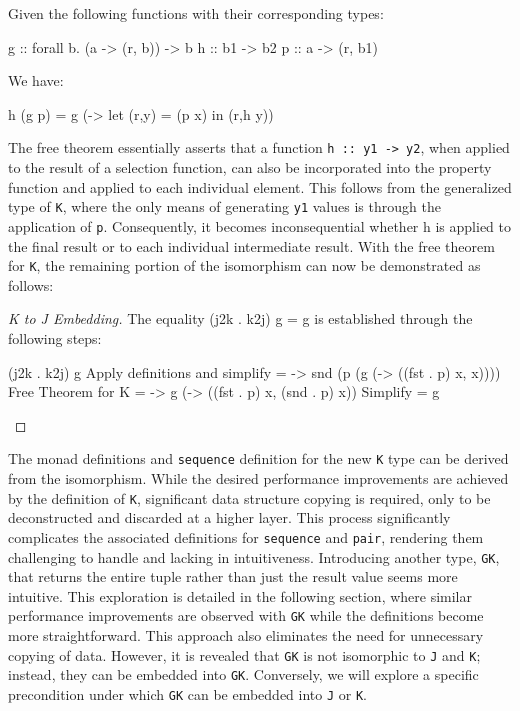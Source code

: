 \documentclass[runningheads]{llncs}
\begin{document}
\begin{theorem}
Given the following functions with their corresponding types:

\begin{haskell}
g :: forall b. (a -> (r, b)) -> b
h :: b1 -> b2
p :: a -> (r, b1)
\end{haskell}

We have:

\begin{haskell}
h (g p) = g (\x -> let (r,y) = (p x) in (r,h y))
\end{haskell}

\end{theorem}

The free theorem essentially asserts that a function
\texttt{h\ ::\ y1\ -\textgreater{}\ y2}, when applied to the result of a
selection function, can also be incorporated into the property function
and applied to each individual element. This follows from the
generalized type of \texttt{K}, where the only means of generating
\texttt{y1} values is through the application of \texttt{p}.
Consequently, it becomes inconsequential whether h is applied to the
final result or to each individual intermediate result. With the free
theorem for \texttt{K}, the remaining portion of the isomorphism can now
be demonstrated as follows:

\begin{proof}[K to J Embedding]
The equality (j2k . k2j) g = g is established through the following steps:

\begin{haskell}
(j2k . k2j) g
{{Apply definitions and simplify}}
= \p -> snd (p (g (\x -> ((fst . p) x, x))))
{{Free Theorem for K }}
= \p -> g (\x -> ((fst . p) x, (snd . p) x))
{{Simplify }}
= g
\end{haskell}

\end{proof}

The monad definitions and \texttt{sequence} definition for the new
\texttt{K} type can be derived from the isomorphism. While the desired
performance improvements are achieved by the definition of \texttt{K},
significant data structure copying is required, only to be deconstructed
and discarded at a higher layer. This process significantly complicates
the associated definitions for \texttt{sequence} and \texttt{pair},
rendering them challenging to handle and lacking in intuitiveness.
Introducing another type, \texttt{GK}, that returns the entire tuple
rather than just the result value seems more intuitive. This exploration
is detailed in the following section, where similar performance
improvements are observed with \texttt{GK} while the definitions become
more straightforward. This approach also eliminates the need for
unnecessary copying of data. However, it is revealed that \texttt{GK} is
not isomorphic to \texttt{J} and \texttt{K}; instead, they can be
embedded into \texttt{GK}. Conversely, we will explore a specific
precondition under which \texttt{GK} can be embedded into \texttt{J} or
\texttt{K}.
\end{document}

